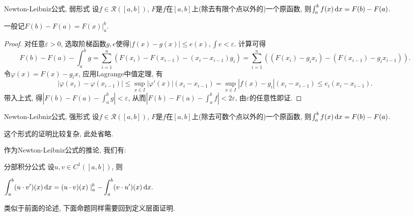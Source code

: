 \begin{theorem}{Newton-Leibniz公式, 弱形式} \label{thm:NLro}
	设$f \in \mathcal{R}([a,b])$, $F$是$f$在$[a,b]$上(除去有限个点以外的)一个原函数, 则$\int_a^b f(x) \mathop{}\!\mathrm{d} x = F(b)-F(a)$. 
\end{theorem}
\begin{remark}
	一般记$F(b)-F(a)=F(x)|_a^b$. 
\end{remark}
\begin{proof}
	对任意$\varepsilon >0$, 选取阶梯函数$g,e$使得$|f(x)-g(x)| \leq e(x),\int e <\varepsilon$. 计算可得$$F(b)-F(a)-\int_a^b g = \sum_{i=1}^{n} (F(x_i)-F(x_{i-1})-(x_i-x_{i-1})g_i) = \sum_{i=1}^{n} ((F(x_i)-g_ix_i)-(F(x_{i-1})-g_ix_{i-1})). $$
	令$\varphi (x)=F(x)-g_ix$, 应用Lagrange中值定理, 有$$|\varphi (x_i)-\varphi (x_{i-1})| \leq \sup_{x \in I}|\varphi '(x)|(x_i-x_{i-1}) = \sup_{x \in I}|f(x)-g_i|(x_i-x_{i-1}) \leq e_i(x_i-x_{i-1}).$$
	带入上式, 得$|F(b)-F(a)-\int_a^b g| < \varepsilon$, 从而$|F(b)-F(a)-\int_a^b f| <2\varepsilon$, 由$\varepsilon$的任意性即证. 
\end{proof}

\begin{theorem}{Newton-Leibniz公式, 强形式}
	设$f \in \mathcal{R}([a,b])$, $F$是$f$在$[a,b]$上(除去可数个点以外的)一个原函数, 则$\int_a^b f(x) \mathop{}\!\mathrm{d} x = F(b)-F(a)$. 
\end{theorem}
\begin{remark}
	这个形式的证明比较复杂, 此处省略. 
\end{remark}

作为Newton-Leibniz公式的推论, 我们有: 

\begin{proposition}{分部积分公式}
	设$u,v\in C^1([a,b])$, 则
	\begin{center}
		$\displaystyle \int_a^b (u\cdot v')(x) \mathop{}\!\mathrm{d} x = (u\cdot v)(x)\mid _a^b - \int_a^b (v \cdot u')(x) \mathop{}\!\mathrm{d} x.$
	\end{center}
\end{proposition}

类似于前面的论述, 下面命题同样需要回到定义层面证明. 

